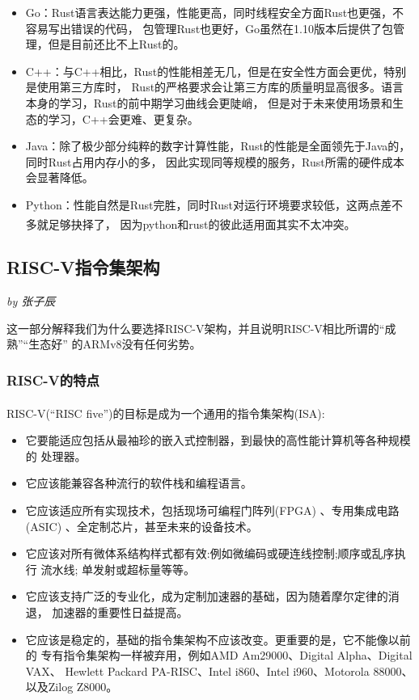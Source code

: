 \documentclass[UTF8,fontset=none,linespread=1.15]{ctexart}
\let\nosupcite\cite
\renewcommand*{\cite}[1]{\textsuperscript{\nosupcite{#1}}}
\newcommand{\sectionauthor}[1]{%
\vspace*{-5ex}
\noindent\textrm{\hfill\textit{by #1}}
\vspace*{2ex}\par}
\begin{document}
\begin{itemize}
\item Go：Rust语言表达能力更强，性能更高，同时线程安全方面Rust也更强，不容易写出错误的代码，
包管理Rust也更好，Go虽然在1.10版本后提供了包管理，但是目前还比不上Rust的。
\item C++：与C++相比，Rust的性能相差无几，但是在安全性方面会更优，特别是使用第三方库时，
Rust的严格要求会让第三方库的质量明显高很多。语言本身的学习，Rust的前中期学习曲线会更陡峭，
但是对于未来使用场景和生态的学习，C++会更难、更复杂。
\item Java：除了极少部分纯粹的数字计算性能，Rust的性能是全面领先于Java的，同时Rust占用内存小的多，
因此实现同等规模的服务，Rust所需的硬件成本会显著降低。
\item Python：性能自然是Rust完胜，同时Rust对运行环境要求较低，这两点差不多就足够抉择了，
因为python和rust的彼此适用面其实不太冲突。\cite{bib:5-why-rust2}
\end{itemize}

\subsection{RISC-V指令集架构}\sectionauthor{张子辰}
这一部分解释我们为什么要选择RISC-V架构，并且说明RISC-V相比所谓的“成熟”“生态好”
的ARMv8没有任何劣势。

\subsubsection{RISC-V的特点}
RISC-V(“RISC five”)的目标是成为一个通用的指令集架构(ISA):\cite{bib:risc-v-manual}
\begin{itemize}
\item 它要能适应包括从最袖珍的嵌入式控制器，到最快的高性能计算机等各种规模的
处理器。
\item 它应该能兼容各种流行的软件栈和编程语言。
\item 它应该适应所有实现技术，包括现场可编程门阵列(FPGA)
 、专用集成电路(ASIC) 、全定制芯片，甚至未来的设备技术。
\item 它应该对所有微体系结构样式都有效:例如微编码或硬连线控制;顺序或乱序执行
流水线; 单发射或超标量等等。
\item 它应该支持广泛的专业化，成为定制加速器的基础，因为随着摩尔定律的消退，
加速器的重要性日益提高。
\item 它应该是稳定的，基础的指令集架构不应该改变。更重要的是，它不能像以前的
专有指令集架构一样被弃用，例如AMD Am29000、Digital Alpha、Digital VAX、
Hewlett Packard PA-RISC、Intel i860、Intel i960、Motorola 88000、以及Zilog
Z8000。
\end{itemize}
\end{document}
